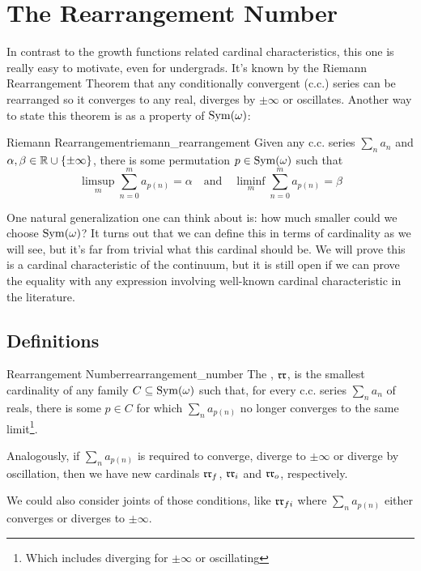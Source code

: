 \chapter{The Rearrangement Number}

In contrast to the growth functions related cardinal characteristics, this one is really easy to motivate, even for undergrads. It's known by the Riemann Rearrangement Theorem that any conditionally convergent (c.c.) series can be rearranged so it converges to any real, diverges by $\pm\infty$ or oscillates. Another way to state this theorem is as a property of $\mathrm{Sym}(\omega)$:
\begin{theorem}{Riemann Rearrangement}{riemann_rearrangement}
    Given any c.c. series $\sum_n a_n$ and $\alpha,\beta\in\mathbb{R}\cup\{\pm\infty\}$, there is some permutation $p\in\mathrm{Sym}(\omega)$ such that
    $$\limsup_m\sum_{n=0}^m a_{p(n)}=\alpha\quad\text{and}\quad\liminf_m\sum_{n=0}^ma_{p(n)}=\beta$$
\end{theorem}
One natural generalization one can think about is: how much smaller could we choose $\mathrm{Sym}(\omega)$? It turns out that we can define this in terms of cardinality as we will see, but it's far from trivial what this cardinal should be. We will prove this is a cardinal characteristic of the continuum, but it is still open if we can prove the equality with any expression involving well-known cardinal characteristic in the literature.

\section{Definitions}

\begin{definition}{Rearrangement Number}{rearrangement_number}
    The , $\mathfrak{rr}$, is the smallest cardinality of any family $C\subseteq\mathrm{Sym}(\omega)$ such that, for every c.c. series $\sum_n a_n$ of reals, there is some $p\in C$ for which $\sum_n a_{p(n)}$ no longer converges to the same limit\footnote{Which includes diverging for $\pm\infty$ or oscillating}.
\end{definition}

Analogously, if $\sum_n a_{p(n)}$ is required to converge, diverge to $\pm\infty$ or diverge by oscillation, then we have new cardinals $\mathfrak{rr}_f$, $\mathfrak{rr}_i$ and $\mathfrak{rr}_o$, respectively.

We could also consider joints of those conditions, like $\mathfrak{rr}_{fi}$ where $\sum_n a_{p(n)}$ either converges or diverges to $\pm\infty$.

